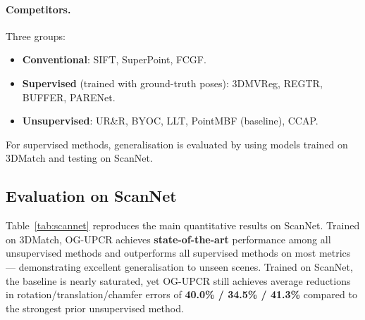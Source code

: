 \documentclass[11pt,a4paper]{article}
\begin{document}
\paragraph{Competitors.}
Three groups:
\begin{itemize}[noitemsep]
  \item \textbf{Conventional}: SIFT, SuperPoint, FCGF.
  \item \textbf{Supervised} (trained with ground-truth poses): 3DMVReg, REGTR, BUFFER,
    PARENet.
  \item \textbf{Unsupervised}: UR\&R, BYOC, LLT, PointMBF (baseline), CCAP.
\end{itemize}
For supervised methods, generalisation is evaluated by using models trained on 3DMatch
and testing on ScanNet.

\subsection{Evaluation on ScanNet}

Table~\ref{tab:scannet} reproduces the main quantitative results on ScanNet. Trained on
3DMatch, OG-UPCR achieves \textbf{state-of-the-art} performance among all unsupervised
methods and outperforms all supervised methods on most metrics — demonstrating excellent
generalisation to unseen scenes. Trained on ScanNet, the baseline is nearly saturated,
yet OG-UPCR still achieves average reductions in rotation/translation/chamfer errors of
\textbf{40.0\% / 34.5\% / 41.3\%} compared to the strongest prior unsupervised method.
\end{document}
